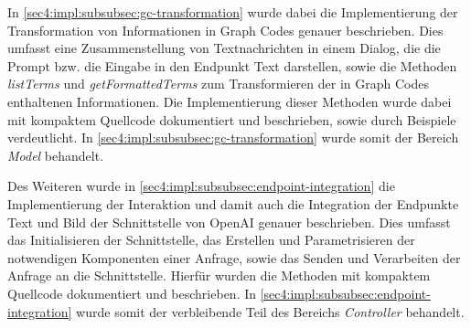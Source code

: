 In \cref{sec4:impl:subsubsec:gc-transformation} wurde dabei die Implementierung der Transformation von Informationen in Graph Codes genauer beschrieben.
Dies umfasst eine Zusammenstellung von Textnachrichten in einem Dialog, die die Prompt bzw. die Eingabe in den Endpunkt Text darstellen, sowie die Methoden \textit{listTerms} und \textit{getFormattedTerms} zum Transformieren der in Graph Codes enthaltenen Informationen.
Die Implementierung dieser Methoden wurde dabei mit kompaktem Quellcode dokumentiert und beschrieben, sowie durch Beispiele verdeutlicht.
In \cref{sec4:impl:subsubsec:gc-transformation} wurde somit der Bereich \textit{Model} behandelt.

Des Weiteren wurde in \cref{sec4:impl:subsubsec:endpoint-integration} die Implementierung der Interaktion und damit auch die Integration der Endpunkte Text und Bild der Schnittstelle von OpenAI genauer beschrieben.
Dies umfasst das Initialisieren der Schnittstelle, das Erstellen und Parametrisieren der notwendigen Komponenten einer Anfrage, sowie das Senden und Verarbeiten der Anfrage an die Schnittstelle.
Hierfür wurden die Methoden mit kompaktem Quellcode dokumentiert und beschrieben.
In \cref{sec4:impl:subsubsec:endpoint-integration} wurde somit der verbleibende Teil des Bereichs \textit{Controller} behandelt.
